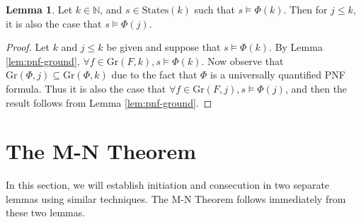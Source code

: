 \documentclass[12pt]{article}
\theoremstyle{definition}
\newtheorem{lemma}{Lemma}
\theoremstyle{remark}
\newcommand{\states}{\text{States}}
\newcommand{\gr}{\text{Gr}}
\begin{document}
\begin{lemma}
  \label{lem:lt-sat}
  Let $k \in \mathbb{N}$, and $s \in \states(k)$ such that $s \models \Phi(k)$.  Then for $j \leq k$, it is also the case that $s \models \Phi(j)$.
\end{lemma}
\begin{proof}
  Let $k$ and $j \leq k$ be given and suppose that $s \models \Phi(k)$.  By Lemma \ref{lem:pnf-ground}, $\forall f \in \gr(F,k), s \models \Phi(k)$.  Now observe that $\gr(\Phi,j) \subseteq \gr(\Phi,k)$ due to the fact that $\Phi$ is a universally quantified PNF formula.  Thus it is also the case that $\forall f \in \gr(F,j), s \models \Phi(j)$, and then the result follows from Lemma \ref{lem:pnf-ground}.
\end{proof}



\section{The M-N Theorem}

In this section, we will establish initiation and consecution in two separate lemmas using similar techniques.  The M-N Theorem follows immediately from these two lemmas.
\end{document}

